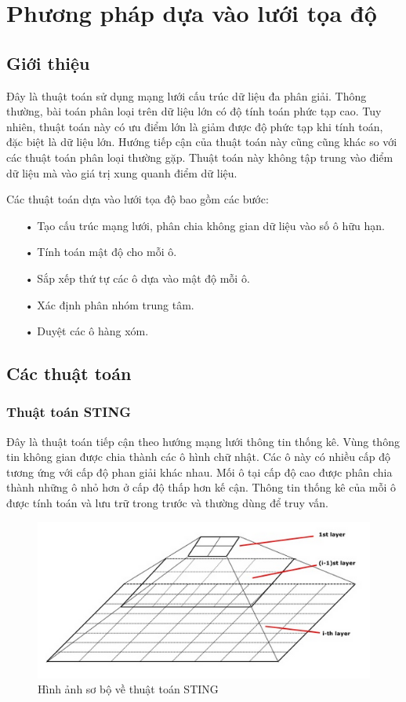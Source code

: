 \section{Phương pháp dựa vào lưới tọa độ}
\subsection{Giới thiệu}
\hspace{10mm}Đây là thuật toán sử dụng mạng lưới cấu trúc dữ liệu đa phân giải. Thông thường, bài toán phân loại trên dữ liệu lớn có độ tính toán phức tạp cao. Tuy nhiên, thuật toán này có ưu điểm lớn là giảm được độ phức tạp khi tính toán, đặc biệt là dữ liệu lớn. Hướng tiếp cận của thuật toán này cũng cũng khác so với các thuật toán phân loại thường gặp. Thuật toán này không tập trung vào điểm dữ liệu mà vào giá trị xung quanh điểm dữ liệu. 

Các thuật toán dựa vào lưới tọa độ bao gồm các bước:
\begin{enumerate}
\item[•]Tạo cấu trúc mạng lưới, phân chia không gian dữ liệu vào số ô hữu hạn.
\item[•]Tính toán mật độ cho mỗi ô.
\item[•]Sắp xếp thứ tự các ô dựa vào mật độ mỗi ô.
\item[•]Xác định phân nhóm trung tâm.
\item[•]Duyệt các ô hàng xóm.
\end{enumerate}

\subsection{Các thuật toán}
\subsubsection{Thuật toán STING}
\hspace{10mm}Đây là thuật toán tiếp cận theo hướng mạng lưới thông tin thống kê. Vùng thông tin không gian được chia thành các ô hình chữ nhật. Các ô này có nhiều cấp độ tương ứng với cấp độ phan giải khác nhau. Mối ô tại cấp độ cao được phân chia thành những ô nhỏ hơn ở cấp độ thấp hơn kế cận. Thông tin thống kê của mỗi ô được tính toán và lưu trữ trong trước và thường dùng để truy vấn.

\clearpage
\begin{figure}[htp]
\centering
\includegraphics{Images/Sting_01}
\caption{Hình ảnh sơ bộ về thuật toán STING}
\label{fig:Sting_01}
\end{figure}

